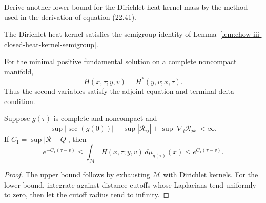 \begin{claim}
\label{clm:chow-iii-dirichlet-mass-lower-bound-exercise}


Derive another lower bound for the Dirichlet heat-kernel mass by the method
used in the derivation of equation (22.41).
\end{claim}

\begin{lemma}
\label{lem:chow-iii-dirichlet-heat-kernel-semigroup}


The Dirichlet heat kernel satisfies the semigroup identity of
Lemma~\ref{lem:chow-iii-closed-heat-kernel-semigroup}.
\end{lemma}

\begin{lemma}
\label{lem:chow-iii-noncompact-heat-adjoint-symmetry}


For the minimal positive fundamental solution on a complete noncompact
manifold,
\[
 H(x,\tau;y,v)=H^*(y,v;x,\tau).
\]
Thus the second variables satisfy the adjoint equation and terminal delta
condition.
\end{lemma}

\begin{lemma}
\label{lem:chow-iii-noncompact-heat-kernel-mass-bound}


Suppose \(g(\tau)\) is complete and noncompact and
\[
 \sup|\sec(g(0))|+\sup|\mathcal R_{ij}|+\sup|\nabla_i\mathcal R_{jk}|<\infty.
\]
If \(C_1=\sup|\mathcal R-Q|\), then
\[
 e^{-C_1(\tau-v)}\le\int_{\mathcal M}H(x,\tau;y,v)
 \,d\mu_{g(\tau)}(x)\le e^{C_1(\tau-v)}.
\]
\end{lemma}
\begin{proof}
\sketch The upper bound follows by exhausting \(\mathcal M\) with Dirichlet kernels.
For the lower bound, integrate against distance cutoffs whose Laplacians tend
uniformly to zero, then let the cutoff radius tend to infinity.
\end{proof}

